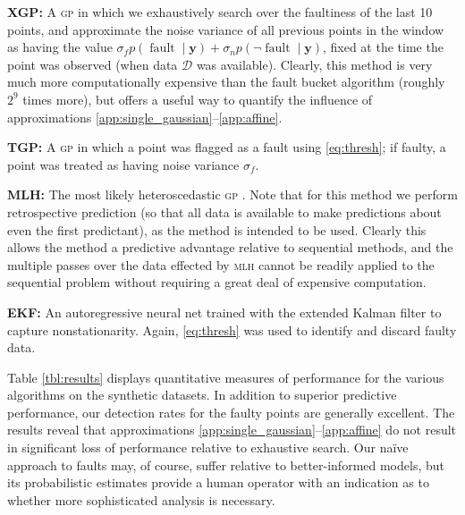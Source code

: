 \documentclass{article}
\newcommand{\given}{\ensuremath{\mid}}
\newcommand{\cm}[1]{\ensuremath{\mathcal{#1}}}
\newcommand{\bm}[1]{\ensuremath{\mathbf{#1}}}
\newcommand{\data}{\ensuremath{\cm{D}}}
\newcommand{\acro}[1]{\textsc{#1}}
\newcommand{\vect}[1]{\bm{#1}}
\newcommand{\vy}{\vect{y}}
\newcommand{\p}[2]{p(#1\given#2)}
\newcommand{\mean}[2]{{m}(#1\given#2)}
\DeclareMathOperator{\fault}{fault}
\begin{document}
{\bf XGP:}
A  \acro{gp} in which we exhaustively search over the faultiness of the last 10 points, and approximate the noise variance of all previous points in the window as having the value $\sigma_f \p{\fault}{\vy} + \sigma_n \p{\neg\fault}{\vy}$, fixed at the time the point was observed (when data $\data$ was available). Clearly, this method is very much more computationally expensive than the fault bucket algorithm (roughly $2^9$ times more), but offers a useful way to quantify the influence of approximations \ref{app:single_gaussian}--\ref{app:affine}.

{\bf TGP:}
A \acro{gp} in which a point was flagged as a fault using \eqref{eq:thresh}; if faulty, a point was treated as having noise variance $\sigma_f$.


{\bf MLH:} 
The most likely heteroscedastic  \acro{gp} \citep{kersting2007most}. Note that for this method we perform retrospective prediction (so that all data is available to make predictions about even the first predictant), as the method is intended to be used. Clearly this allows the method a predictive advantage relative to sequential methods, and the multiple passes over the data effected by \acro{mlh} cannot be readily applied to the sequential problem without requiring a great deal of expensive computation. 

{\bf EKF:}
An autoregressive neural net trained with the extended Kalman filter to capture nonstationarity. Again, \eqref{eq:thresh} was used to identify and discard faulty data.

Table \ref{tbl:results} displays quantitative measures of performance
for the various algorithms on the synthetic
datasets.  
In addition to superior predictive performance, our
detection rates for the faulty points are generally excellent. The results reveal that approximations \ref{app:single_gaussian}--\ref{app:affine} do not result in significant loss of performance relative to exhaustive search. Our na\"{i}ve approach to faults may, of course, suffer relative to better-informed models, but its probabilistic estimates provide a human operator with an indication as to whether more sophisticated analysis is necessary.
\end{document}
